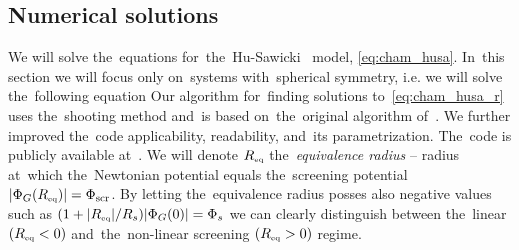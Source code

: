 

\subsection{Numerical solutions}
\label{sec:num_cham}
We will solve the~equations for~the~Hu-Sawicki \fR\ model, \eqref{eq:cham_husa}. In~this section we will focus only on~systems with~spherical symmetry, i.e. we will solve the~following equation
Our algorithm for~finding solutions to~\eqref{eq:cham_husa_r} uses the~shooting method \parencite{10.5555/42249} and~is based on~the~original algorithm of~\textcite{mastersthesis_vrastil}. We further improved the~code applicability, readability, and~its parametrization. The~code is publicly available at~. We will denote $R_\text{\tiny eq}$ the~\textit{equivalence radius} -- radius at~which the~Newtonian potential equals the~screening potential $|\Phi_G(R_\text{\tiny eq})|=\Phi_{\text{\scriptsize scr}}$. By letting the~equivalence radius posses also negative values such as $(1+|R_\text{\tiny eq}|/R_s)|\Phi_G(0)|=\Phi_s$ we can clearly distinguish between the~linear $(R_\text{\tiny eq}<0)$ and~the~non-linear screening $(R_\text{\tiny eq}>0)$ regime.

